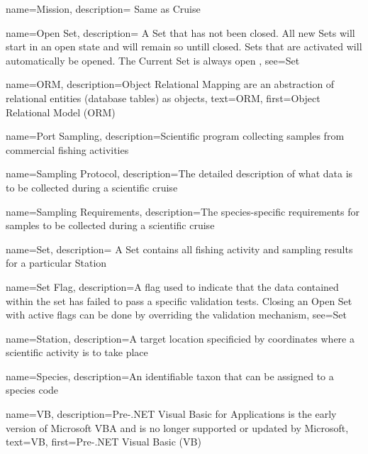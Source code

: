  {
    name=Mission,
    description={
        Same as \gls{Cruise}
    }
}

 {
    name=Open Set,
    description={
        A \gls{Set} that has not been closed. All new Sets will start in an open state and will remain so untill closed.
        Sets that are activated will automatically be opened.
        The \gls{Current Set} is always open
    },
    see={Set}
}

 {
    name=ORM,
    description={Object Relational Mapping are an abstraction of relational entities (database tables) as objects},
    text={ORM},
    first={Object Relational Model (ORM)}
}

 {
    name=Port Sampling,
    description={Scientific program collecting samples from commercial fishing activities}
}

 {
    name=Sampling Protocol,
    description={The detailed description of what data is to be collected during a scientific cruise}
}

 {
    name=Sampling Requirements,
    description={The species-specific requirements for samples to be collected during a scientific cruise}
}

 {
    name=Set,
    description={
        A Set contains all fishing activity and sampling results for a particular \gls{Station}
    }
}

 {
    name=Set Flag,
    description={A flag used to indicate that the data contained within the set has failed to pass a specific validation tests.
    Closing an \gls{Open Set} with active flags can be done by overriding the validation mechanism},
    see=\gls{Set}
}

 {
    name=Station,
    description={A target location specificied by coordinates where a scientific activity is to take place}
}

 {
    name=Species,
    description={An identifiable taxon that can be assigned to a species code}
}

 {
    name=VB,
    description={Pre-.NET Visual Basic for Applications is the early version of Microsoft VBA and is no longer supported or updated by Microsoft},
    text={VB},
    first={Pre-.NET Visual Basic (VB)}
}

